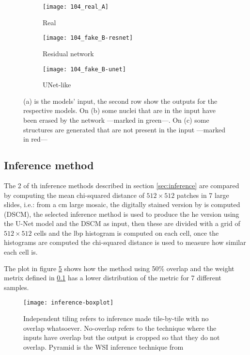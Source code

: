 \documentclass[../main.tex]{subfiles}
\begin{document}
\begin{figure}[h]
\centering
\begin{subfigure}{.5\textwidth}
  \centering
  \texttt{[image: 104\_real\_A]}
  \caption{Real}
  \label{fig:real-example}
\end{subfigure}
\begin{subfigure}{.5\textwidth}
  \centering
  \texttt{[image: 104\_fake\_B-resnet]}
  \caption{Residual network}
  \label{fig:resnet-example}
\end{subfigure}%
\begin{subfigure}{.5\textwidth}
  \centering
  \texttt{[image: 104\_fake\_B-unet]}
  \caption{UNet-like}
  \label{fig:unet-example}
\end{subfigure}
\caption{(a) is the models' input, the second row show the outputs for the
respective models. On (b) some nuclei that are in the input have been
erased by the network ---marked in green---. On (c) some structures are
generated that are not present in the input ---marked in red---}
\label{fig:resnet-unet}
\end{figure}

\subsection{Inference method}
The 2 of th inference methods described in section \ref{sec:inference} are
compared by
computing the mean chi-squared distance of $512 \times 512$ patches 
in 7 large slides,
i.e.: from a \gls{cm} large mosaic, the digitally stained
version by \cite{Gareau2009} is computed (DSCM), the selected inference method
is used to produce the \gls{he} version using the U-Net model and the DSCM
as input, then these are divided with a grid of $512 \times 512$ cells and the
\gls{lbp} histogram is computed on each cell, once the histograms are computed
the chi-squared distance is used to measure how similar each cell is.

The plot in figure \ref{fig:inference-comparison} shows how the method using
50\% overlap and the weight metrix defined in \ref{} has a lower distribution
of the metric for 7 different samples.

\begin{figure}
\centering
\texttt{[image: inference-boxplot]}
\caption{Independent tiling refers to inference made tile-by-tile with no overlap
whatsoever. No-overlap refers to the technique where the inputs have overlap but
the output is cropped so that they do not overlap. Pyramid is the WSI inference
technique from \cite{Bel2019}}
\label{fig:inference-comparison}
\end{figure}

\end{document}
